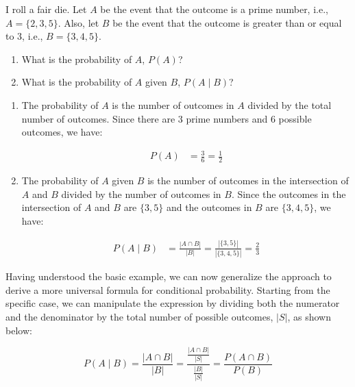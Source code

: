 \begin{example}
I roll a fair die. Let \( A \) be the event that the outcome is a prime number, i.e., \( A = \{2, 3, 5\} \). Also, let \( B \) be the event that the outcome is greater than or equal to 3, i.e., \( B = \{3, 4, 5\} \). 

\begin{enumerate}[label=(\alph*)]
    \item What is the probability of \( A \), \( P(A) \)?
    \item What is the probability of \( A \) given \( B \), \( P(A \mid B) \)?
\end{enumerate}

\end{example}

\begin{solution}
    \begin{enumerate}[label=(\alph*)]
        \item The probability of \( A \) is the number of outcomes in \( A \) divided by the total number of outcomes. Since there are 3 prime numbers and 6 possible outcomes, we have:
    
        \begin{align*}
        P(A) &= \frac{3}{6} = \frac{1}{2}
        \end{align*}
    
        \item The probability of \( A \) given \( B \) is the number of outcomes in the intersection of \( A \) and \( B \) divided by the number of outcomes in \( B \). Since the outcomes in the intersection of \( A \) and \( B \) are \(\{3, 5\}\) and the outcomes in \( B \) are \(\{3, 4, 5\}\), we have:
    
        \begin{align*}
        P(A \mid B) &=\frac{|A \cap B|}{|B|} = \frac{|\{3,5\}|}{|\{3,4, 5\}|} = \frac{2}{3}
        \end{align*}

    \end{enumerate}
\end{solution}

Having understood the basic example, we can now generalize the approach to derive a more universal formula for conditional probability. Starting from the specific case, we can manipulate the expression by dividing both the numerator and the denominator by the total number of possible outcomes, \( |S| \), as shown below:

\[
P(A \mid B) = \frac{|A \cap B|}{|B|} = \frac{\frac{|A \cap B|}{|S|}}{\frac{|B|}{|S|}} = \frac{P(A \cap B)}{P(B)}
\]


